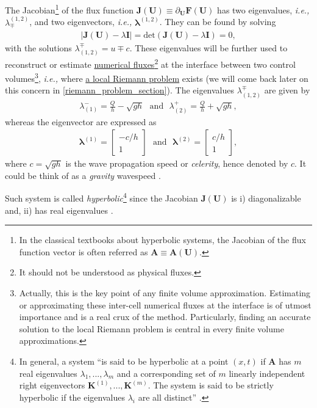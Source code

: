 \documentclass[a4paper]{article}
\numberwithin{equation}{section}
\newcommand{\ie}{\textit{i.e.,} }
\begin{document}
	The Jacobian\footnote{In the classical textbooks \cite{leveque_2002,toro2013} about hyperbolic systems, the Jacobian of the flux function vector is often referred as $\mathbf{A}\equiv\mathbf{A}(\mathbf{U})$.} of the flux function  $\mathbf{J(U)}\equiv\partial_{\mathbf{U}}\mathbf{F(U)}$ has two eigenvalues, \ie $\lambda^{(1,2)}_{\mp}$, and two eigenvectors, \ie $\boldsymbol{\lambda}^{(1,2)}$. They can be found by solving
	\begin{align}
		|\mathbf{J(U)}-\lambda\mathbf{I}|=\mathrm{det}(\mathbf{J(U)}-\lambda\mathbf{I})=0,
	\end{align}
	with the solutions $\lambda^{\mp}_{(1,2)} = u \mp c$. These eigenvalues will be further used to reconstruct or estimate \underline{numerical fluxes}\footnote{It should not be understood as physical fluxes.} at the interface between two control volumes\footnote{Actually, this is the key point of any finite volume approximation. Estimating or approximating these inter-cell numerical fluxes at the interface is of utmost importance and is a real crux of the method. Particularly, finding an accurate solution to the local Riemann problem is central in every finite volume approximations.}, \ie where \underline{a local Riemann problem} exists (we will come back later on this concern in  \ref{riemann_problem_section}). The eigenvalues $\lambda^{\mp}_{(1,2)}$ are given by
	\begin{align}
		\lambda_{(1)}^{-} = \frac{Q}{h} - \sqrt{gh} \,\,\,\, \mathrm{and} \,\,\,\, \lambda_{(2)}^{+} = \frac{Q}{h} + \sqrt{gh},
	\end{align}
	whereas the eigenvector are expressed as
	\begin{align}
		\boldsymbol{\lambda}^{(1)}=		
		\begin{bmatrix}
			-c/h \\
			1 
		\end{bmatrix}
		\,\,\,\, \mathrm{and} \,\,\,\,
		\boldsymbol{\lambda}^{(2)}=		
		\begin{bmatrix}
			c/h \\
			1 
		\end{bmatrix},
	\end{align}
	where $c=\sqrt{gh}$ is the wave propagation speed or \textit{celerity}, hence denoted by $c$. It could be think of as a \textit{gravity} wavespeed \parencite{kerger2011}.
	
	Such system is called  \textit{hyperbolic}\footnote{In general, a system \enquote{is said to be hyperbolic at a point $(x,t)$ if $\mathbf{A}$ has $m$ real eigenvalues $\lambda_1,...,\lambda_m$ and a corresponding set of $m$ linearly independent right eigenvectors $\mathbf{K}^{(1)} ,..., \mathbf{K}^{(m)}$. The system is said to be strictly hyperbolic if the eigenvalues $\lambda_i$ are all distinct} \parencite[see pp. 45, chap. 2.1 Quasi-Linear Equations: Basic Concepts]{toro2013}.} since the Jacobian $\mathbf{J(U)}$ is i) diagonalizable and, ii) has real eigenvalues  \parencite[see pp. 31, chap. 2.9 Hyperbolicity of Linear Systems]{leveque_2002}. 
		
\end{document}
